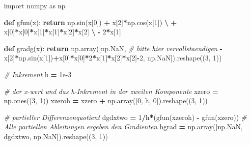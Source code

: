 \documentclass[]{book}
\newenvironment{Shaded}{\begin{snugshade}}{\end{snugshade}}
\newcommand{\CommentTok}[1]{\textcolor[rgb]{0.56,0.35,0.01}{\textit{#1}}}
\newcommand{\ControlFlowTok}[1]{\textcolor[rgb]{0.13,0.29,0.53}{\textbf{#1}}}
\newcommand{\DecValTok}[1]{\textcolor[rgb]{0.00,0.00,0.81}{#1}}
\newcommand{\FloatTok}[1]{\textcolor[rgb]{0.00,0.00,0.81}{#1}}
\newcommand{\ImportTok}[1]{#1}
\newcommand{\KeywordTok}[1]{\textcolor[rgb]{0.13,0.29,0.53}{\textbf{#1}}}
\newcommand{\NormalTok}[1]{#1}
\newcommand{\OperatorTok}[1]{\textcolor[rgb]{0.81,0.36,0.00}{\textbf{#1}}}
\theoremstyle{definition}
\theoremstyle{definition}
\theoremstyle{definition}
\theoremstyle{definition}
\theoremstyle{remark}
\begin{document}
\begin{Shaded}
\begin{Highlighting}[]
\ImportTok{import}\NormalTok{ numpy }\ImportTok{as}\NormalTok{ np}


\KeywordTok{def}\NormalTok{ gfun(x):}
    \ControlFlowTok{return}\NormalTok{ np.sin(x[}\DecValTok{0}\NormalTok{]) }\OperatorTok{+}\NormalTok{ x[}\DecValTok{2}\NormalTok{]}\OperatorTok{*}\NormalTok{np.cos(x[}\DecValTok{1}\NormalTok{]) }\OperatorTok{\textbackslash{}}
        \OperatorTok{+}\NormalTok{ x[}\DecValTok{0}\NormalTok{]}\OperatorTok{*}\NormalTok{x[}\DecValTok{0}\NormalTok{]}\OperatorTok{*}\NormalTok{x[}\DecValTok{1}\NormalTok{]}\OperatorTok{*}\NormalTok{x[}\DecValTok{1}\NormalTok{]}\OperatorTok{*}\NormalTok{x[}\DecValTok{2}\NormalTok{]}\OperatorTok{*}\NormalTok{x[}\DecValTok{2}\NormalTok{] }\OperatorTok{\textbackslash{}}
        \OperatorTok{-} \DecValTok{2}\OperatorTok{*}\NormalTok{x[}\DecValTok{1}\NormalTok{]}


\KeywordTok{def}\NormalTok{ gradg(x):}
    \ControlFlowTok{return}\NormalTok{ np.array([np.NaN,  }\CommentTok{# bitte hier vervollstaendigen}
                     \OperatorTok{-}\NormalTok{x[}\DecValTok{2}\NormalTok{]}\OperatorTok{*}\NormalTok{np.sin(x[}\DecValTok{1}\NormalTok{])}\OperatorTok{+}\NormalTok{x[}\DecValTok{0}\NormalTok{]}\OperatorTok{*}\NormalTok{x[}\DecValTok{0}\NormalTok{]}\OperatorTok{*}\DecValTok{2}\OperatorTok{*}\NormalTok{x[}\DecValTok{1}\NormalTok{]}\OperatorTok{*}\NormalTok{x[}\DecValTok{2}\NormalTok{]}\OperatorTok{*}\NormalTok{x[}\DecValTok{2}\NormalTok{]}\OperatorTok{-}\DecValTok{2}\NormalTok{,}
\NormalTok{                     np.NaN]).reshape((}\DecValTok{3}\NormalTok{, }\DecValTok{1}\NormalTok{))}


\CommentTok{# Inkrement}
\NormalTok{h }\OperatorTok{=} \FloatTok{1e-3}

\CommentTok{# der x-wert und das h-Inkrement in der zweiten Komponente}
\NormalTok{xzero }\OperatorTok{=}\NormalTok{ np.ones((}\DecValTok{3}\NormalTok{, }\DecValTok{1}\NormalTok{))}
\NormalTok{xzeroh }\OperatorTok{=}\NormalTok{ xzero }\OperatorTok{+}\NormalTok{ np.array([}\DecValTok{0}\NormalTok{, h, }\DecValTok{0}\NormalTok{]).reshape((}\DecValTok{3}\NormalTok{, }\DecValTok{1}\NormalTok{))}

\CommentTok{# partieller Differenzenquotient}
\NormalTok{dgdxtwo }\OperatorTok{=} \DecValTok{1}\OperatorTok{/}\NormalTok{h}\OperatorTok{*}\NormalTok{(gfun(xzeroh) }\OperatorTok{-}\NormalTok{ gfun(xzero))}
\CommentTok{# Alle partiellen Ableitungen ergeben den Gradienten}
\NormalTok{hgrad }\OperatorTok{=}\NormalTok{ np.array([np.NaN, dgdxtwo, np.NaN]).reshape((}\DecValTok{3}\NormalTok{, }\DecValTok{1}\NormalTok{))}


\end{Highlighting}
\end{Shaded}
\end{document}
